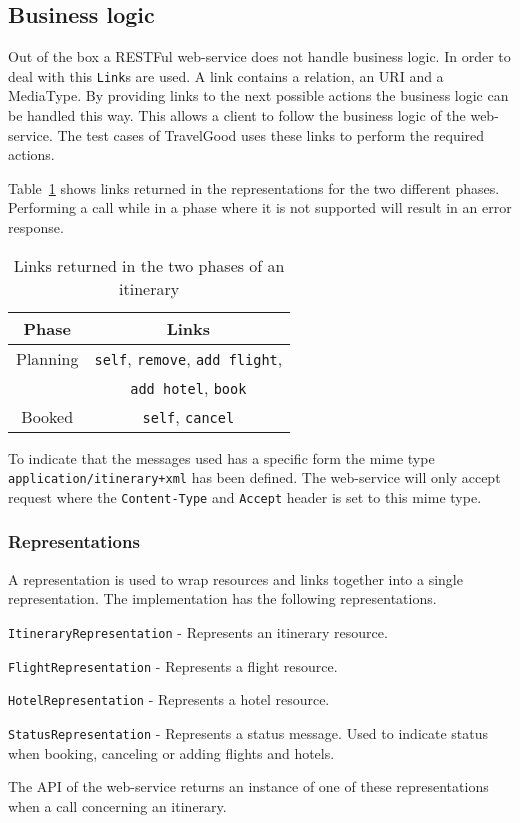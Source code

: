 \subsection{Business logic}
Out of the box a RESTFul web-service does not handle business logic. In order to deal with this \texttt{Link}s are used. A link contains a relation, an URI and a MediaType. By providing links to the next possible actions the business logic can be handled this way. This allows a client to follow the business logic of the web-service. The test cases of TravelGood uses these links to perform the required actions.

Table~\ref{table:rest_business_logic} shows links returned in the representations for the two different phases. Performing a call while in a phase where it is not supported will result in an error response.
\begin{table}
\begin{tabular}{|c|c|}
\hline
\textbf{Phase} & \textbf{Links} \\
\hline
Planning & \texttt{self}, \texttt{remove}, \texttt{add flight},\\
		 &\texttt{add hotel}, \texttt{book}\\
\hline
Booked & \texttt{self}, \texttt{cancel}\\
\hline
\end{tabular}
\caption{Links returned in the two phases of an itinerary}
\label{table:rest_business_logic}
\end{table}

To indicate that the messages used has a specific form the mime type \texttt{application/itinerary+xml} has been defined. The web-service will only accept request where the \texttt{Content-Type} and \texttt{Accept} header is set to this mime type.

\subsubsection{Representations}
A representation is used to wrap resources and links together into a single representation. 
The implementation has the following representations.
\begin{description}
	\item \texttt{ItineraryRepresentation} - Represents an itinerary resource. 
	\item \texttt{FlightRepresentation} - Represents a flight resource.
	\item \texttt{HotelRepresentation} - Represents a hotel resource.
	\item \texttt{StatusRepresentation} - Represents a status message. Used to indicate status when booking, canceling or adding flights and hotels.
\end{description}
The API of the web-service returns an instance of one of these representations when a call concerning an itinerary.